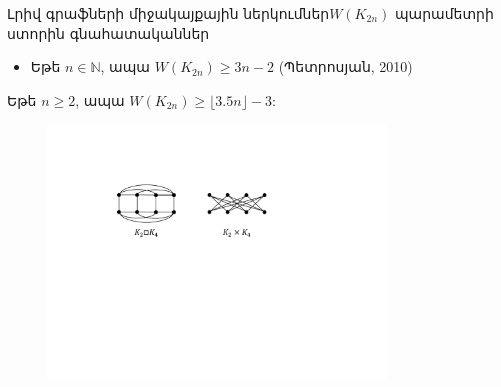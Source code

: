 \begin{frame}{Լրիվ գրաֆների միջակայքային ներկումներ}{$W(K_{2n})$ պարամետրի ստորին գնահատականներ}



\begin{itemize}
\item Եթե $n\in \mathbb{N}$, ապա $W(K_{2n}) \geq 3n-2$ (Պետրոսյան, 2010)
\end{itemize}

\begin{theorem}[1.4.2]
Եթե $n \geq 2$, ապա $W(K_{2n}) \geq \lfloor 3.5n \rfloor - 3$:
\end{theorem}

\begin{figure}[b!]
\centering
\includegraphics[width=0.8\textwidth]{figures/K_8products.pdf}
\label{K_8products}
\end{figure}

\end{frame}

